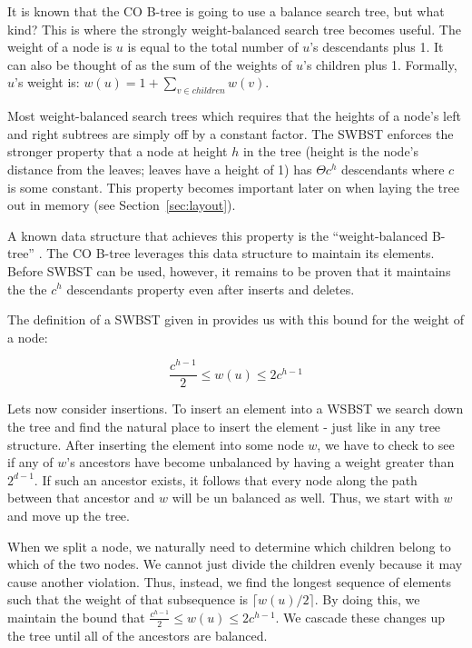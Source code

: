\documentclass{style}
\begin{document}
It is known that the CO B-tree is going to use a balance search tree, but what
kind? This is where the strongly weight-balanced search tree becomes useful. The
weight of a node is $u$ is equal to the total number of $u$'s descendants plus
1. It can also be thought of as the sum of the weights of $u$'s children plus
1. Formally, $u$'s weight is: $w(u) = 1 + \sum_{v \in children} w(v)$.

Most weight-balanced search trees which requires that the heights of a node's
left and right subtrees are simply off by a constant factor. The SWBST enforces the
stronger property that a node at height $h$ in the tree (height is the node's
distance from the leaves; leaves have a height of 1) has $\Theta c^h$
descendants where $c$ is some constant. This property becomes important later
on when laying the tree out in memory (see Section~\ref{sec:layout}).

A known data structure that achieves this property is the ``weight-balanced
B-tree'' \cite{swbst}. The CO B-tree leverages this data structure to maintain
its elements. Before SWBST can be used, however, it remains to be proven that
it maintains the the $c^h$ descendants property even after inserts and
deletes.

The definition of a SWBST given in \cite{swbst} provides us with this bound for the
weight of a node:

\begin{equation}
\frac{c^{h-1}}{2} \leq w(u) \leq 2c^{h-1}
\end{equation}

Lets now consider insertions. To insert an element into a WSBST we search down
the tree and find the natural place to insert the element - just like in any
tree structure. After inserting the element into some node $w$, we have to
check to see if any of $w$'s ancestors have become unbalanced by having a
weight greater than $2^{d-1}$. If such an ancestor exists, it follows that
every node along the path between that ancestor and $w$ will be un balanced as
well. Thus, we start with $w$ and move up the tree.

When we split a node, we naturally need to determine which children belong to
which of the two nodes. We cannot just divide the children evenly because it
may cause another violation. Thus, instead, we find the longest sequence of
elements such that the weight of that subsequence is $\lceil w(u)/2 \rceil$.
By doing this, we maintain the bound that $\frac{c^{h-1}}{2} \leq w(u) \leq
2c^{h-1}$. We cascade these changes up the tree until all of the ancestors
are balanced.
\end{document}
